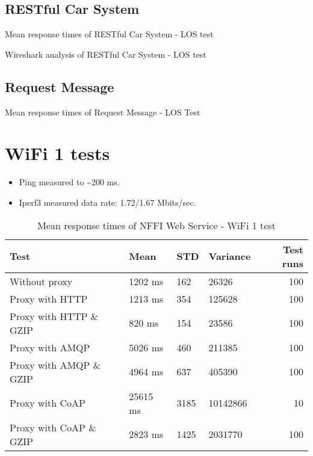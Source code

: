 \begin{appendices}
\subsection{RESTful Car System}

\begin{table}[H]

\caption{Mean response times of RESTful Car System - LOS test}
\end{table}

\begin{table}[H]

\caption{Wireshark analysis of RESTful Car System - LOS test}
\end{table}

\subsection{Request Message}
\begin{table}[H]

\caption{Mean response times of Request Message - LOS Test}
\end{table}


\section{WiFi 1 tests}

\begin{itemize}
	\item Ping measured to \textasciitilde 200 ms.
	\item Iperf3 measured data rate: 1.72/1.67 Mbits/sec.
\end{itemize}

\begin{table}[H]
\begin{tabular}{llllr}
\hline
 Test                   &   Mean &   STD &   Variance &   Test runs \\
\hline
  Without proxy & 1202 ms & 162 & 26326 & 100 \\
  Proxy with HTTP & 1213 ms & 354 & 125628 & 100 \\
  Proxy with HTTP \& GZIP & 820 ms & 154 & 23586 & 100 \\
  Proxy with AMQP & 5026 ms & 460 & 211385 & 100 \\
  Proxy with AMQP \& GZIP & 4964 ms & 637 & 405390 & 100\\
  Proxy with CoAP & 25615 ms & 3185 & 10142866 & 10 \\
  Proxy with CoAP \& GZIP & 2823 ms & 1425 & 2031770 & 100 \\
\end{tabular}
\caption{Mean response times of NFFI Web Service - WiFi 1 test}
\end{table}



\end{appendices}
